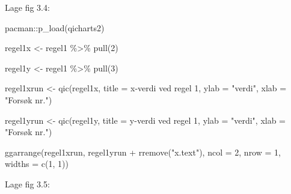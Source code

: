 \documentclass[
]{book}
\newenvironment{Shaded}{\begin{snugshade}}{\end{snugshade}}
\newcommand{\AttributeTok}[1]{\textcolor[rgb]{0.77,0.63,0.00}{#1}}
\newcommand{\DecValTok}[1]{\textcolor[rgb]{0.00,0.00,0.81}{#1}}
\newcommand{\FunctionTok}[1]{\textcolor[rgb]{0.00,0.00,0.00}{#1}}
\newcommand{\NormalTok}[1]{#1}
\newcommand{\OtherTok}[1]{\textcolor[rgb]{0.56,0.35,0.01}{#1}}
\newcommand{\SpecialCharTok}[1]{\textcolor[rgb]{0.00,0.00,0.00}{#1}}
\newcommand{\StringTok}[1]{\textcolor[rgb]{0.31,0.60,0.02}{#1}}
\begin{document}
Lage fig 3.4:

\begin{Shaded}
\begin{Highlighting}[]
\NormalTok{pacman}\SpecialCharTok{::}\FunctionTok{p\_load}\NormalTok{(qicharts2)}

\NormalTok{regel1x }\OtherTok{\textless{}{-}}\NormalTok{ regel1 }\SpecialCharTok{\%\textgreater{}\%} \FunctionTok{pull}\NormalTok{(}\DecValTok{2}\NormalTok{)}

\NormalTok{regel1y }\OtherTok{\textless{}{-}}\NormalTok{ regel1 }\SpecialCharTok{\%\textgreater{}\%} \FunctionTok{pull}\NormalTok{(}\DecValTok{3}\NormalTok{)}

\NormalTok{regel1xrun }\OtherTok{\textless{}{-}} \FunctionTok{qic}\NormalTok{(regel1x, }\AttributeTok{title =} \StringTok{\textquotesingle{}x{-}verdi ved regel 1\textquotesingle{}}\NormalTok{, }\AttributeTok{ylab =} \StringTok{"verdi"}\NormalTok{, }\AttributeTok{xlab =} \StringTok{"Forsøk nr."}\NormalTok{)}

\NormalTok{regel1yrun }\OtherTok{\textless{}{-}} \FunctionTok{qic}\NormalTok{(regel1y, }\AttributeTok{title =} \StringTok{\textquotesingle{}y{-}verdi ved regel 1\textquotesingle{}}\NormalTok{, }\AttributeTok{ylab =} \StringTok{"verdi"}\NormalTok{, }\AttributeTok{xlab =} \StringTok{"Forsøk nr."}\NormalTok{)}

\FunctionTok{ggarrange}\NormalTok{(regel1xrun, regel1yrun }\SpecialCharTok{+} \FunctionTok{rremove}\NormalTok{(}\StringTok{"x.text"}\NormalTok{), }\AttributeTok{ncol =} \DecValTok{2}\NormalTok{, }\AttributeTok{nrow =} \DecValTok{1}\NormalTok{,  }\AttributeTok{widths =} \FunctionTok{c}\NormalTok{(}\DecValTok{1}\NormalTok{, }\DecValTok{1}\NormalTok{))}
\end{Highlighting}
\end{Shaded}

Lage fig 3.5:
\end{document}
